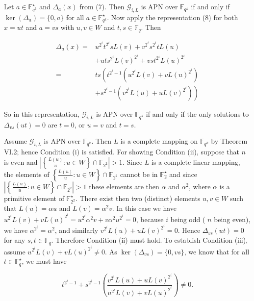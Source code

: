\documentclass[10pt]{article}
\begin{document}
Let $a \in \mathbb{F}_{q^{k}}^{\star}$ and $\Delta_{a}(x)$ from (7). Then $\mathcal{G}_{i, L}$ is APN over $\mathbb{F}_{q^{k}}$ if and only if $\operatorname{ker}\left(\Delta_{a}\right)=\{0, a\}$ for all $a \in \mathbb{F}_{q^{k}}^{\star}$. Now apply the representation (8) for both $x=u t$ and $a=v s$ with $u, v \in W$ and $t, s \in \mathbb{F}_{q}$. Then

$$
\begin{aligned}
\Delta_{a}(x)= & u^{2^{i}} t^{2^{i}} s L(v)+v^{2^{i}} s^{2^{i}} t L(u) \\
& +u t s^{2^{i}} L(v)^{2^{i}}+v s t^{2^{i}} L(u)^{2^{i}} \\
= & t s\left(t^{2^{i}-1}\left(u^{2^{i}} L(v)+v L(u)^{2^{i}}\right)\right. \\
& \left.+s^{2^{i}-1}\left(v^{2^{i}} L(u)+u L(v)^{2^{i}}\right)\right)
\end{aligned}
$$

So in this representation, $\mathcal{G}_{i, L}$ is APN over $\mathbb{F}_{q^{k}}$ if and only if the only solutions to $\Delta_{v s}(u t)=0$ are $t=0$, or $u=v$ and $t=s$.

Assume $\mathcal{G}_{i, L}$ is APN over $\mathbb{F}_{q^{k}}$. Then $L$ is a complete mapping on $\mathbb{F}_{q^{k}}$ by Theorem VI.2; hence Condition (i) is satisfied. For showing Condition (ii), suppose that $n$ is even and $\left|\left\{\frac{L(u)}{u}: u \in W\right\} \cap \mathbb{F}_{2^{2}}\right|>1$. Since $L$ is a complete linear mapping, the elements of $\left\{\frac{L(u)}{u}: u \in W\right\} \cap \mathbb{F}_{2^{2}}$ cannot be in $\mathbb{F}_{2}^{\star}$ and since $\left|\left\{\frac{L(u)}{u}: u \in W\right\} \cap \mathbb{F}_{2^{2}}\right|>1$ these elements are then $\alpha$ and $\alpha^{2}$, where $\alpha$ is a primitive element of $\mathbb{F}_{2^{2}}^{\star}$. There exist then two (distinct) elements $u, v \in W$ such that $L(u)=\alpha u$ and $L(v)=\alpha^{2} v$. In this case we have $u^{2^{i}} L(v)+v L(u)^{2^{i}}=u^{2^{i}} \alpha^{2} v+v \alpha^{2} u^{2^{i}}=0$, because $i$ being odd ( $n$ being even), we have $\alpha^{2^{i}}=\alpha^{2}$, and similarly $v^{2^{i}} L(u)+u L(v)^{2^{i}}=0$. Hence $\Delta_{v s}(u t)=0$ for any $s, t \in \mathbb{F}_{q}$. Therefore Condition (ii) must hold. To establish Condition (iii), assume $u^{2^{i}} L(v)+v L(u)^{2^{i}} \neq 0$. As $\operatorname{ker}\left(\Delta_{v s}\right)=\{0, v s\}$, we know that for all $t \in \mathbb{F}_{q}^{\star}$, we must have

$$
t^{2^{i}-1}+s^{2^{i}-1}\left(\frac{v^{2^{i}} L(u)+u L(v)^{2^{i}}}{u^{2^{i}} L(v)+v L(u)^{2^{i}}}\right) \neq 0 .
$$
\end{document}
